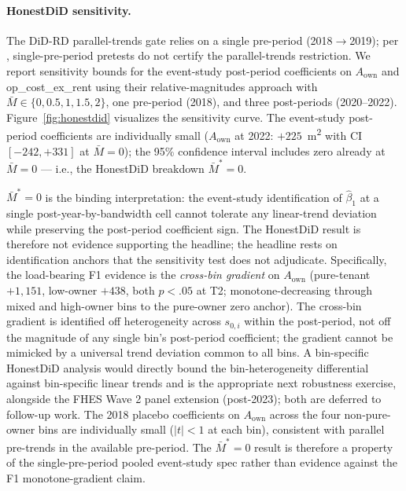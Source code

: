 \documentclass[12pt, a4paper]{article}
\begin{document}
\paragraph{HonestDiD sensitivity.} The DiD-RD parallel-trends gate relies on a single pre-period (2018$\to$2019); per \citet{Roth2022_pretrends}, single-pre-period pretests do not certify the parallel-trends restriction. We report \citet{RambachanRoth2023_honestdid} sensitivity bounds for the event-study post-period coefficients on $A_{\text{own}}$ and op\_cost\_ex\_rent using their relative-magnitudes approach with $\bar M \in \{0, 0.5, 1, 1.5, 2\}$, one pre-period (2018), and three post-periods (2020--2022). Figure~\ref{fig:honestdid} visualizes the sensitivity curve. The event-study post-period coefficients are individually small ($A_{\text{own}}$ at 2022: $+225$~m\textsuperscript{2} with CI $[-242, +331]$ at $\bar M = 0$); the 95\% confidence interval includes zero already at $\bar M = 0$ --- i.e., the HonestDiD breakdown $\bar M^* = 0$.

$\bar M^* = 0$ is the binding interpretation: the event-study identification of $\hat\beta_1$ at a single post-year-by-bandwidth cell cannot tolerate any linear-trend deviation while preserving the post-period coefficient sign. The HonestDiD result is therefore not evidence supporting the headline; the headline rests on identification anchors that the sensitivity test does not adjudicate. Specifically, the load-bearing F1 evidence is the \emph{cross-bin gradient} on $A_{\text{own}}$ (pure-tenant $+1{,}151$, low-owner $+438$, both $p < .05$ at T2; monotone-decreasing through mixed and high-owner bins to the pure-owner zero anchor). The cross-bin gradient is identified off heterogeneity across $s_{0,i}$ within the post-period, not off the magnitude of any single bin's post-period coefficient; the gradient cannot be mimicked by a universal trend deviation common to all bins. A bin-specific HonestDiD analysis would directly bound the bin-heterogeneity differential against bin-specific linear trends and is the appropriate next robustness exercise, alongside the FHES Wave 2 panel extension (post-2023); both are deferred to follow-up work. The 2018 placebo coefficients on $A_{\text{own}}$ across the four non-pure-owner bins are individually small ($|t| < 1$ at each bin), consistent with parallel pre-trends in the available pre-period. The $\bar M^* = 0$ result is therefore a property of the single-pre-period pooled event-study spec rather than evidence against the F1 monotone-gradient claim.
\end{document}
